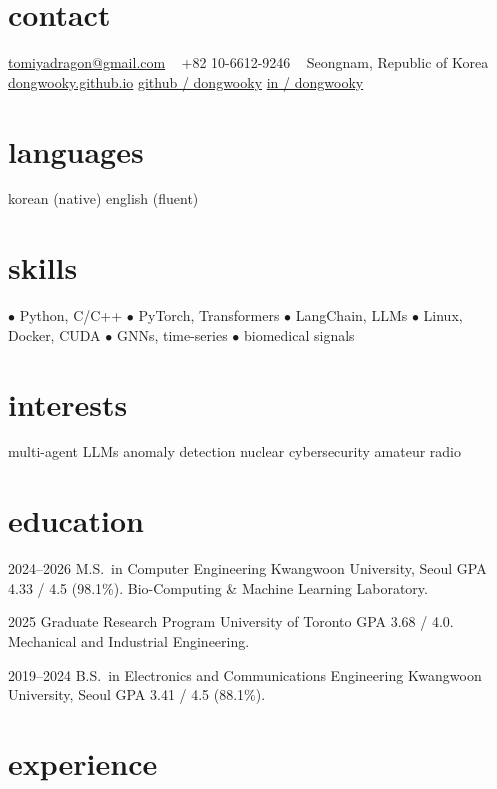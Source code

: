 \documentclass[]{cv-friggeri-x}
\begin{document}

\begin{aside}
\section{contact}
\href{mailto:tomiyadragon@gmail.com}{tomiyadragon@gmail.com}
~
+82 10-6612-9246
~
Seongnam, Republic of Korea
~
\href{https://dongwooky.github.io}{dongwooky.github.io}
\href{https://github.com/dongwooky}{github / dongwooky}
\href{https://linkedin.com/in/dongwooky}{in / dongwooky}
\section{languages}
korean (native)
english (fluent)
\section{skills}
{\color{red}$\bullet$} Python, C/C++
{\color{red}$\bullet$} PyTorch, Transformers
{\color{red}$\bullet$} LangChain, LLMs
{\color{red}$\bullet$} Linux, Docker, CUDA
{\color{red}$\bullet$} GNNs, time-series
{\color{red}$\bullet$} biomedical signals
\section{interests}
multi-agent LLMs
anomaly detection
nuclear cybersecurity
amateur radio
\end{aside}

\section{education}

\begin{entrylist}
\entry
  {2024--2026}
  {M.S.\ {\normalfont in Computer Engineering}}
  {Kwangwoon University, Seoul}
  {GPA 4.33 / 4.5 (98.1\%). Bio-Computing \& Machine Learning Laboratory.}

\entry
  {2025}
  {Graduate Research Program}
  {University of Toronto}
  {GPA 3.68 / 4.0. Mechanical and Industrial Engineering.}

\entry
  {2019--2024}
  {B.S.\ {\normalfont in Electronics and Communications Engineering}}
  {Kwangwoon University, Seoul}
  {GPA 3.41 / 4.5 (88.1\%).}

\end{entrylist}

\section{experience}
\end{document}

